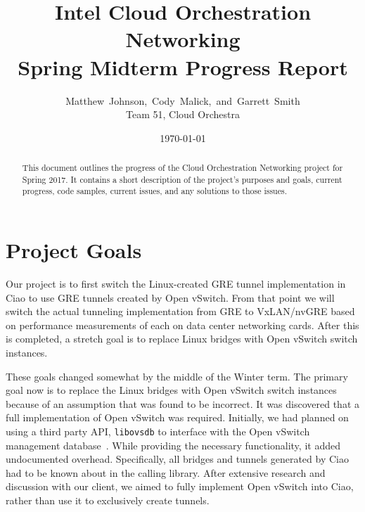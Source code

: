 \documentclass[10pt,onecolumn,journal,draftclsnofoot]{IEEEtran}
\begin{document}
\begin{titlepage}
	\title{Intel Cloud Orchestration Networking\\ Spring Midterm Progress Report}
	\author{Matthew~Johnson,~Cody~Malick,~and~Garrett~Smith\\
		Team 51, Cloud Orchestra}
	\date{\today}
	\maketitle
	\vspace{4cm}
	\begin{abstract}
		\noindent This document outlines the progress of the Cloud
		Orchestration Networking project for Spring 2017. It contains
		a short description of the project's purposes
		and goals, current progress, code samples, current issues,
		and any solutions to those issues. \end{abstract}

\end{titlepage}
\tableofcontents
\clearpage

\section{Project Goals}

Our project is to first switch the Linux-created GRE tunnel implementation in
Ciao to use GRE tunnels created by Open vSwitch. From that point we will switch
the actual tunneling implementation from GRE to VxLAN/nvGRE based on performance
measurements of each on data center networking cards. After this is completed, a
stretch goal is to replace Linux bridges with Open vSwitch switch instances.

These goals changed somewhat by the middle of the Winter term. The primary goal
now is to replace the Linux bridges with Open vSwitch switch instances because
of an assumption that was found to be incorrect. It was discovered that a full
implementation of Open vSwitch was required. Initially, we had planned on using
a third party API, \texttt{libovsdb} to interface with the Open vSwitch
management database~\cite{libovsdb}. While providing the necessary
functionality, it added undocumented overhead. Specifically, all bridges and
tunnels generated by Ciao had to be known about in the calling library. After
extensive research and discussion with our client, we aimed to fully implement
Open vSwitch into Ciao, rather than use it to exclusively create tunnels.
\end{document}
